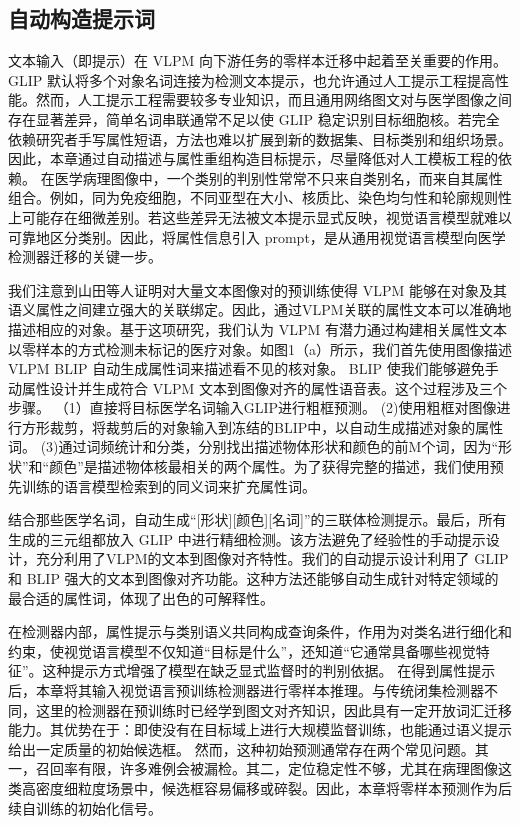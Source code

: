 \subsection{自动构造提示词}
文本输入（即提示）在 VLPM 向下游任务的零样本迁移中起着至关重要的作用。GLIP 默认将多个对象名词连接为检测文本提示，也允许通过人工提示工程提高性能\cite{li2022grounded}。然而，人工提示工程需要较多专业知识，而且通用网络图文对与医学图像之间存在显著差异，简单名词串联通常不足以使 GLIP 稳定识别目标细胞核。若完全依赖研究者手写属性短语，方法也难以扩展到新的数据集、目标类别和组织场景。因此，本章通过自动描述与属性重组构造目标提示，尽量降低对人工模板工程的依赖。
在医学病理图像中，一个类别的判别性常常不只来自类别名，而来自其属性组合。例如，同为免疫细胞，不同亚型在大小、核质比、染色均匀性和轮廓规则性上可能存在细微差别。若这些差异无法被文本提示显式反映，视觉语言模型就难以可靠地区分类别。因此，将属性信息引入 prompt，是从通用视觉语言模型向医学检测器迁移的关键一步。

我们注意到山田等人证明对大量文本图像对的预训练使得 VLPM 能够在对象及其语义属性之间建立强大的关联绑定\cite{yamada2022lemons}。因此，通过VLPM关联的属性文本可以准确地描述相应的对象。基于这项研究，我们认为 VLPM 有潜力通过构建相关属性文本以零样本的方式检测未标记的医疗对象。如图1（a）所示，我们首先使用图像描述VLPM BLIP \cite{li2022blip}自动生成属性词来描述看不见的核对象。 BLIP 使我们能够避免手动属性设计并生成符合 VLPM 文本到图像对齐的属性语音表。这个过程涉及三个步骤。 （1）直接将目标医学名词输入GLIP进行粗框预测。 (2)使用粗框对图像进行方形裁剪，将裁剪后的对象输入到冻结的BLIP中，以自动生成描述对象的属性词。 (3)通过词频统计和分类，分别找出描述物体形状和颜色的前M个词，因为“形状”和“颜色”是描述物体核最相关的两个属性。为了获得完整的描述，我们使用预先训练的语言模型检索到的同义词来扩充属性词\cite{radford2019language}。

结合那些医学名词，自动生成“[形状][颜色][名词]”的三联体检测提示。最后，所有生成的三元组都放入 GLIP 中进行精细检测。该方法避免了经验性的手动提示设计，充分利用了VLPM的文本到图像对齐特性。我们的自动提示设计利用了 GLIP 和 BLIP 强大的文本到图像对齐功能。这种方法还能够自动生成针对特定领域的最合适的属性词，体现了出色的可解释性。

在检测器内部，属性提示与类别语义共同构成查询条件，作用为对类名进行细化和约束，使视觉语言模型不仅知道“目标是什么”，还知道“它通常具备哪些视觉特征”。这种提示方式增强了模型在缺乏显式监督时的判别依据。
在得到属性提示后，本章将其输入视觉语言预训练检测器进行零样本推理。与传统闭集检测器不同，这里的检测器在预训练时已经学到图文对齐知识，因此具有一定开放词汇迁移能力。其优势在于：即使没有在目标域上进行大规模监督训练，也能通过语义提示给出一定质量的初始候选框。
然而，这种初始预测通常存在两个常见问题。其一，召回率有限，许多难例会被漏检。其二，定位稳定性不够，尤其在病理图像这类高密度细粒度场景中，候选框容易偏移或碎裂。因此，本章将零样本预测作为后续自训练的初始化信号。
